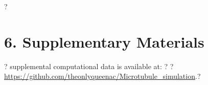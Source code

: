 ?\section*{6. Supplementary Materials}?
supplemental computational data is available at: ?
?\url{https://github.com/theonlyqueenac/Microtubule_simulation}.?


